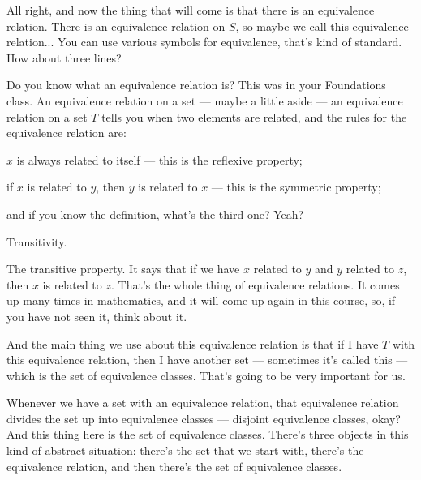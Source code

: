\begin{speech}[00:38:05 - 00:39:19]
All right, and now the thing that will come is that there is an equivalence relation.  There is an equivalence relation on $S$, so maybe we call this equivalence relation...  You can use various symbols for equivalence, that's kind of standard. How about three lines?

Do you know what an equivalence relation is? This was in your Foundations class. An equivalence relation on a set --- maybe a little aside  --- an equivalence relation on a set $T$ tells you when two elements are related, and the rules for the equivalence relation are:

$x$ is always related to itself --- this is the reflexive property; 

if $x$ is related to $y$, then $y$ is related to $x$ --- this is the symmetric property; 

and if you know the definition, what's the third one? Yeah?
\end{speech}

\begin{student}
Transitivity.
\end{student}

\begin{speech}[00:39:20 - 00:40:21]
The transitive property. It says that if we have $x$ related to $y$ and $y$ related to $z$, then $x$ is related to $z$.  That's the whole thing of equivalence relations. It comes up many times in mathematics, and it will come up again in this course, so, if you have not seen it, think about it.

And the main thing we use about this equivalence relation is that if I have $T$ with this equivalence relation, then I have another set --- sometimes it's called this --- which is the set of equivalence classes.  That's going to be very important for us.

Whenever we have a set with an equivalence relation, that equivalence relation divides the set up into equivalence classes --- disjoint equivalence classes, okay? And this thing here is the set of equivalence classes. There's three objects in this kind of abstract situation: there's the set that we start with, there's the equivalence relation, and then there's the set of equivalence classes.
\end{speech}

